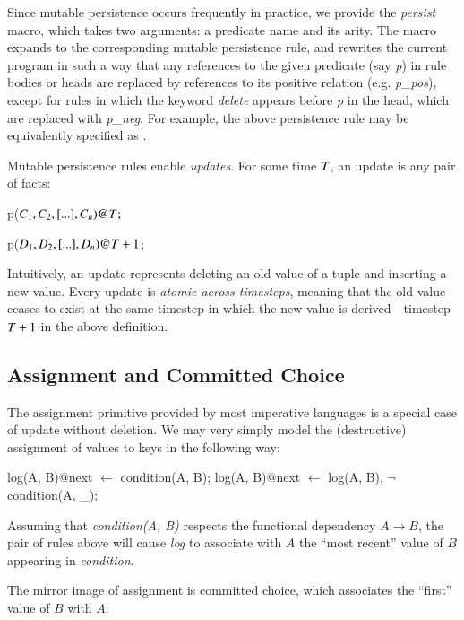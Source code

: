 Since mutable persistence occurs frequently in practice, we provide the {\em
persist} macro, which takes 
two arguments: a predicate name and its arity. 
The macro
expands to the corresponding mutable persistence rule, and rewrites the current program
in such a way that any references to the given predicate (say \emph{p}) in rule bodies or heads are replaced by references
to its positive relation (e.g. \emph{p\_pos}), except for rules in which the keyword \emph{delete}
appears before \emph{p} in the head, which are replaced with \emph{p\_neg}.  For example, the above
 persistence rule may be equivalently specified as
.

Mutable persistence rules enable {\em updates}.  For some time $\DT$, an
update is any pair of facts:

\begin{dedalus}
p\nega($C_1,C_2,[...],C_n)@\DT;$
\end{dedalus}

\begin{dedalus}
p\pos($D_1,D_2,[...],D_n)@\DT+1$;
\end{dedalus}


\noindent
Intuitively, an update represents deleting an old value of a tuple and
inserting a new value.  Every update is {\em atomic across timesteps}, meaning
that the old value ceases to exist at the same timestep in which the new value
is derived---timestep $\DT+1$ in the above definition.

\subsection{Assignment and Committed Choice}

The assignment primitive provided by most imperative languages is a  special 
case of update without deletion.  We may very simply model the (destructive) assignment 
of values to keys in the following way:

\begin{Dedalus}
log(A, B)@next \(\leftarrow\) condition(A, B);
log(A, B)@next \(\leftarrow\) log(A, B), \(\lnot\)condition(A, _);
\end{Dedalus}

Assuming that {\em condition(A, B)} respects the functional dependency $A \to B$, the pair 
of rules above will cause {\em log} to associate with $A$ the ``most recent'' value of $B$
appearing in {\em condition}.

The mirror image of assignment is committed choice, which associates the ``first'' value
of $B$ with $A$:

